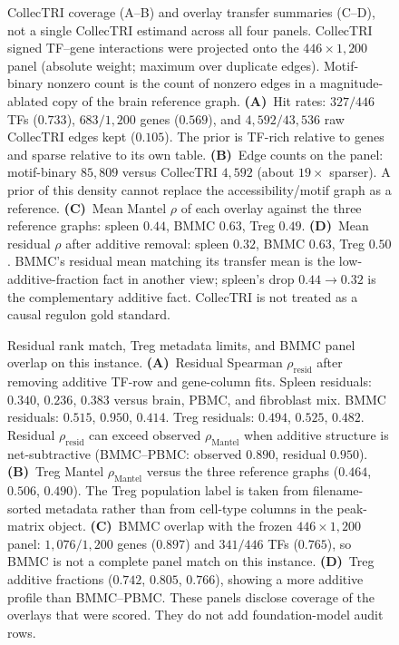 \documentclass[fleqn,10pt,lineno]{wlpeerj}
\newcommand{\fitfig}[1]{\resizebox{\ifdim\width>\linewidth\linewidth\else\width\fi}{!}{#1}}
\begin{document}
\begin{figure}[!htbp]
\centering
\fitfig{}
\caption{CollecTRI coverage (A--B) and overlay transfer summaries (C--D), not a single CollecTRI
estimand across all four panels.
CollecTRI signed TF--gene interactions were projected onto the
$446\times 1{,}200$ panel (absolute weight; maximum over duplicate edges). Motif-binary nonzero count is
the count of nonzero edges in a magnitude-ablated copy of the brain reference graph.
\textbf{(A)}~Hit rates: $327/446$ TFs ($0.733$), $683/1{,}200$ genes ($0.569$), and
$4{,}592/43{,}536$ raw CollecTRI edges kept ($0.105$). The prior is TF-rich relative to genes and
sparse relative to its own table.
\textbf{(B)}~Edge counts on the panel: motif-binary $85{,}809$ versus CollecTRI $4{,}592$ (about
$19\times$ sparser). A prior of this density cannot replace the accessibility/motif graph as a
reference.
\textbf{(C)}~Mean Mantel $\rho$ of each overlay against the three reference graphs: spleen
$0.44$, BMMC $0.63$, Treg $0.49$.
\textbf{(D)}~Mean residual $\rho$ after additive removal: spleen $0.32$, BMMC $0.63$, Treg $0.50$.
BMMC's residual mean matching its transfer mean is the low-additive-fraction fact in another view;
spleen's drop $0.44\rightarrow 0.32$ is the complementary additive fact.
CollecTRI is not treated as a causal regulon gold standard.}
\label{fig:app-collectri}
\end{figure}

\begin{figure}[!htbp]
\centering
\fitfig{}
\caption{Residual rank match, Treg metadata limits, and BMMC panel overlap on this instance.
\textbf{(A)}~Residual Spearman $\rho_{\mathrm{resid}}$ after removing additive TF-row and gene-column fits. Spleen
residuals: $0.340$, $0.236$, $0.383$ versus brain, PBMC, and fibroblast mix. BMMC residuals:
$0.515$, $0.950$, $0.414$. Treg residuals: $0.494$, $0.525$, $0.482$. Residual $\rho_{\mathrm{resid}}$ can exceed
observed $\rho_{\mathrm{Mantel}}$ when additive structure is net-subtractive (BMMC--PBMC: observed $0.890$, residual
$0.950$).
\textbf{(B)}~Treg Mantel $\rho_{\mathrm{Mantel}}$ versus the three reference graphs ($0.464$, $0.506$, $0.490$).
The Treg population label is taken from filename-sorted metadata rather than from cell-type
columns in the peak-matrix object.
\textbf{(C)}~BMMC overlap with the frozen $446\times 1{,}200$ panel: $1{,}076/1{,}200$ genes
($0.897$) and $341/446$ TFs ($0.765$), so BMMC is not a complete panel match on this instance.
\textbf{(D)}~Treg additive fractions ($0.742$, $0.805$, $0.766$), showing a more additive profile
than BMMC--PBMC.
These panels disclose coverage of the overlays that were scored. They do not add foundation-model audit rows.}
\label{fig:app-coverage}
\end{figure}
\FloatBarrier

\end{document}
